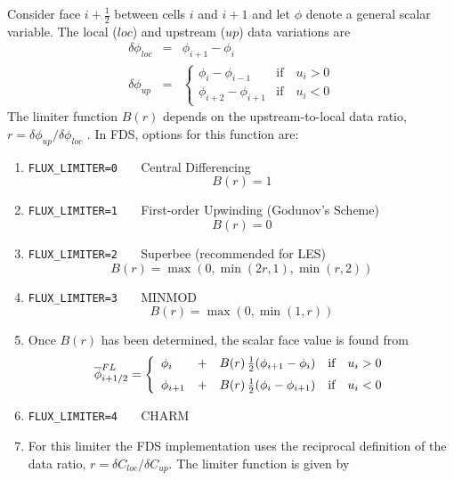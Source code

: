 Consider face $i+\frac{1}{2}$ between cells $i$ and $i+1$ and let $\phi$ denote a general scalar variable.  The local ($loc$) and upstream ($up$) data variations are
\begin{eqnarray}
\delta \phi_{loc} &=& \phi_{i+1}-\phi_i \nonumber\\
\delta \phi_{up}  &=& \left\{ \begin{array}{ll} \phi_i-\phi_{i-1} & \mbox{if} \quad u_i>0 \\ \phi_{i+2}-\phi_{i+1} & \mbox{if} \quad u_i<0 \end{array} \right. \nonumber
\end{eqnarray}
The limiter function $B(r)$ depends on the upstream-to-local data ratio, $r=\delta \phi_{up}/\delta \phi_{loc}$ \cite{Toro}.  In FDS, options for this function are:
\begin{enumerate}
\item[]{\tt FLUX\_LIMITER=0\,\,\,} Central Differencing  \begin{equation} B(r) = 1 \end{equation}
\item[]{\tt FLUX\_LIMITER=1\,\,\,} First-order Upwinding (Godunov's Scheme) \begin{equation} B(r) = 0 \end{equation}
\item[]{\tt FLUX\_LIMITER=2\,\,\,} Superbee (recommended for LES) \begin{equation} B(r) = \max(0,\min(2r,1),\min(r,2)) \end{equation}
\item[]{\tt FLUX\_LIMITER=3\,\,\,} MINMOD \begin{equation} B(r) = \max(0,\min(1,r)) \end{equation}
\item[]
Once $B(r)$ has been determined, the scalar face value is found from
\begin{equation}
\label{eqn_flux_limiter}
\overline{\phi}^{FL}_{i+1/2} = \left\{ \begin{array}{lcll} \phi_i &+& B(r) \,\frac{1}{2}(\phi_{i+1}-\phi_i) & \mbox{if} \quad u_i>0 \vspace{0.2 cm}\\
\phi_{i+1} &+& B(r) \,\frac{1}{2}(\phi_i-\phi_{i+1}) & \mbox{if} \quad u_i<0 \end{array} \right.
\end{equation}
\item[]{\tt FLUX\_LIMITER=4\,\,\,} CHARM
\item[] For this limiter the FDS implementation uses the reciprocal definition of the data ratio, $r = \delta C_{loc}/\delta C_{up}$.  The limiter function is given by \cite{Zhou:1995,Kempf:2003}

\end{enumerate}
